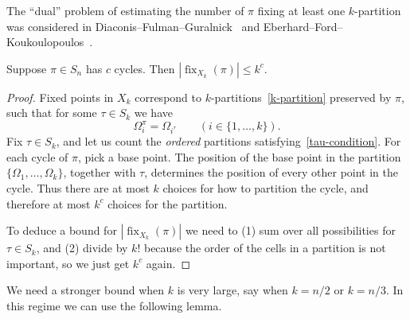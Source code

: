 \documentclass[ALCO,ThmDefs,Unicode,epreuves]{cedram}
\DeclareMathOperator{\fix}{fix}
\begin{document}
\begin{rema}
The ``dual'' problem of estimating the number of $\pi$ fixing at least one $k$-partition was considered in Diaconis--Fulman--Guralnick~\cite[Sections~5~and~6]{diaconis--fulman--guralnick} and Eberhard--Ford--Koukoulopoulos~\cite[Theorem~1.2]{eberhard--ford--koukoulopoulos}.
\end{rema}

\begin{lemma} \label{imprimitive_small_k_bound}
Suppose $\pi \in S_n$ has $c$ cycles. Then $|\fix_{X_k}(\pi)| \leq k^c$.
\end{lemma}
\begin{proof}
Fixed points in $X_k$ correspond to $k$-partitions~\eqref{k-partition} preserved by $\pi$, \ie such that for some $\tau\in S_k$ we have
\begin{equation} \label{tau-condition}
 \Omega_i^\pi = \Omega_{i^\tau} \qquad (i \in \{1, \dots, k\}).
\end{equation}
Fix $\tau \in S_k$, and let us count the \emph{ordered} partitions satisfying~\eqref{tau-condition}. For each cycle of $\pi$, pick a base point. The position of the base point in the partition $\{\Omega_1, \dots, \Omega_k\}$, together with $\tau$, determines the position of every other point in the cycle. Thus there are at most $k$ choices for how to partition the cycle, and therefore at most $k^c$ choices for the partition.

To deduce a bound for $|\fix_{X_k}(\pi)|$ we need to (1) sum over all possibilities for $\tau \in S_k$, and (2) divide by $k!$ because the order of the cells in a partition is not important, so we just get $k^c$ again.
\end{proof}

We need a stronger bound when $k$ is very large, say when $k = n/2$ or $k=n/3$. In this regime we can use the following lemma.
\end{document}
